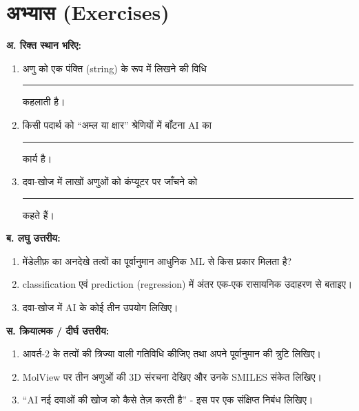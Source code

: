 \section*{अभ्यास (Exercises)}
\textbf{अ. रिक्त स्थान भरिए:}
\begin{enumerate}[leftmargin=1.6em]
  \item अणु को एक पंक्ति (string) के रूप में लिखने की विधि \rule{2.8cm}{0.4pt} कहलाती है।
  \item किसी पदार्थ को “अम्ल या क्षार” श्रेणियों में बाँटना AI का \rule{2.8cm}{0.4pt} कार्य है।
  \item दवा-खोज में लाखों अणुओं को कंप्यूटर पर जाँचने को \rule{2.8cm}{0.4pt} कहते हैं।
\end{enumerate}

\textbf{ब. लघु उत्तरीय:}
\begin{enumerate}[leftmargin=1.6em]
  \item मेंडेलीफ़ का अनदेखे तत्वों का पूर्वानुमान आधुनिक ML से किस प्रकार मिलता है?
  \item classification एवं prediction (regression) में अंतर एक-एक रासायनिक उदाहरण से बताइए।
  \item दवा-खोज में AI के कोई तीन उपयोग लिखिए।
\end{enumerate}

\textbf{स. क्रियात्मक / दीर्घ उत्तरीय:}
\begin{enumerate}[leftmargin=1.6em]
  \item आवर्त-2 के तत्वों की त्रिज्या वाली गतिविधि कीजिए तथा अपने पूर्वानुमान की त्रुटि
        लिखिए।
  \item MolView पर तीन अणुओं की 3D संरचना देखिए और उनके SMILES संकेत लिखिए।
  \item “AI नई दवाओं की खोज को कैसे तेज़ करती है” - इस पर एक संक्षिप्त निबंध लिखिए।
\end{enumerate}

